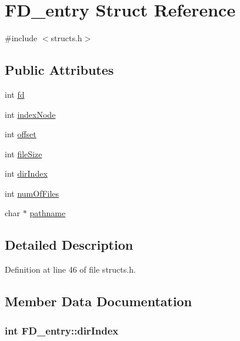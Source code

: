 \hypertarget{struct_f_d__entry}{\section{F\-D\-\_\-entry Struct Reference}
\label{struct_f_d__entry}
}


{\ttfamily \#include $<$structs.\-h$>$}

\subsection*{Public Attributes}
\begin{DoxyCompactItemize}
\item 
int \hyperlink{struct_f_d__entry_a9d5e0d0d64fc6fceda961322163b6620}{fd}
\item 
int \hyperlink{struct_f_d__entry_a8461f9539fc8eae9aa1d82a1bd6fe99b}{index\-Node}
\item 
int \hyperlink{struct_f_d__entry_a8cb331b4498a68fca8cc03256a678abb}{offset}
\item 
int \hyperlink{struct_f_d__entry_ab206b321649292d979ed9e30c7c9758e}{file\-Size}
\item 
int \hyperlink{struct_f_d__entry_a7615964d23f9dba2f09fee120cefd3c3}{dir\-Index}
\item 
int \hyperlink{struct_f_d__entry_a2db15c840d91b43d3073b88e41d88fe9}{num\-Of\-Files}
\item 
char $\ast$ \hyperlink{struct_f_d__entry_ab49d494b001884423ed0b27c35fe8373}{pathname}
\end{DoxyCompactItemize}


\subsection{Detailed Description}


Definition at line 46 of file structs.\-h.



\subsection{Member Data Documentation}
\hypertarget{struct_f_d__entry_a7615964d23f9dba2f09fee120cefd3c3}{
\subsubsection[{dir\-Index}]{\setlength{\rightskip}{0pt plus 5cm}int F\-D\-\_\-entry\-::dir\-Index}}\label{struct_f_d__entry_a7615964d23f9dba2f09fee120cefd3c3}


